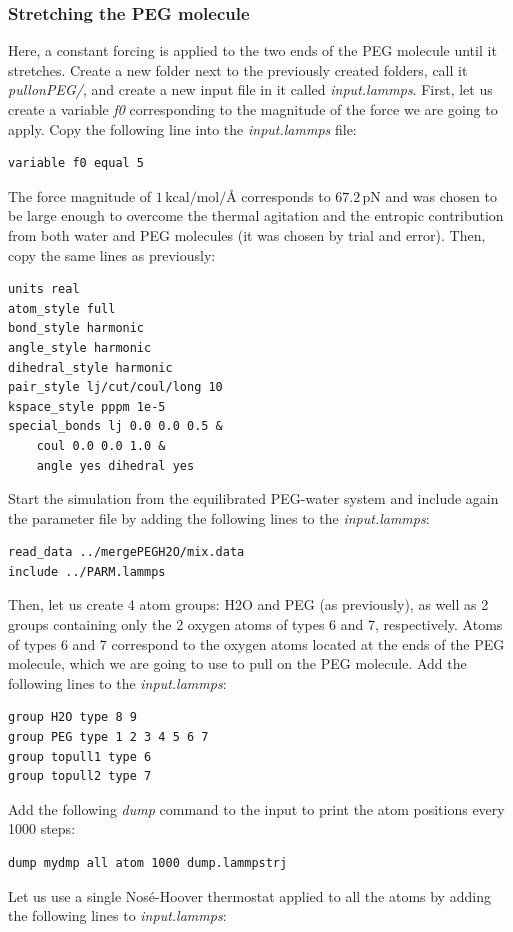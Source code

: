 \documentclass[9pt,tutorial]{livecoms}
\begin{document}
\subsubsection{Stretching the PEG molecule}
Here, a constant forcing is applied to the two ends of the PEG molecule until it stretches. Create a new folder next to the previously created folders, call it \textit{pullonPEG/}, and create a new input file in it called \textit{input.lammps}. First, let us create a variable \textit{f0} corresponding to the magnitude of the force we are going to apply. Copy the following line into the \textit{input.lammps} file:
{\normalsize \begin{verbatim}
variable f0 equal 5
\end{verbatim}}
The force magnitude of $1\,\text{kcal/mol/\AA{}}$ corresponds to $67.2\,\text{pN}$ and was chosen to be large enough to overcome the thermal agitation and the entropic contribution from both water and PEG molecules (it was chosen by trial and error). Then, copy the same lines as previously:
{\normalsize \begin{verbatim}
units real
atom_style full
bond_style harmonic
angle_style harmonic
dihedral_style harmonic
pair_style lj/cut/coul/long 10
kspace_style pppm 1e-5
special_bonds lj 0.0 0.0 0.5 &
    coul 0.0 0.0 1.0 &
    angle yes dihedral yes
\end{verbatim}}
Start the simulation from the equilibrated PEG-water system and include again the parameter file by adding the following lines to the \textit{input.lammps}:
{\normalsize \begin{verbatim}
read_data ../mergePEGH2O/mix.data
include ../PARM.lammps
\end{verbatim}}
Then, let us create 4 atom groups: H2O and PEG (as previously), as well as 2 groups containing only the 2 oxygen atoms of types 6 and 7, respectively. Atoms of types 6 and 7 correspond to the oxygen atoms located at the ends of the PEG molecule, which we are going to use to pull on the PEG molecule. Add the following lines to the \textit{input.lammps}:
{\normalsize \begin{verbatim}
group H2O type 8 9
group PEG type 1 2 3 4 5 6 7
group topull1 type 6
group topull2 type 7
\end{verbatim}}
Add the following \textit{dump} command to the input to print the atom positions every 1000 steps:
{\normalsize \begin{verbatim}
dump mydmp all atom 1000 dump.lammpstrj
\end{verbatim}}
Let us use a single Nosé-Hoover thermostat applied to all the atoms by adding the following lines to \textit{input.lammps}:
\end{document}
